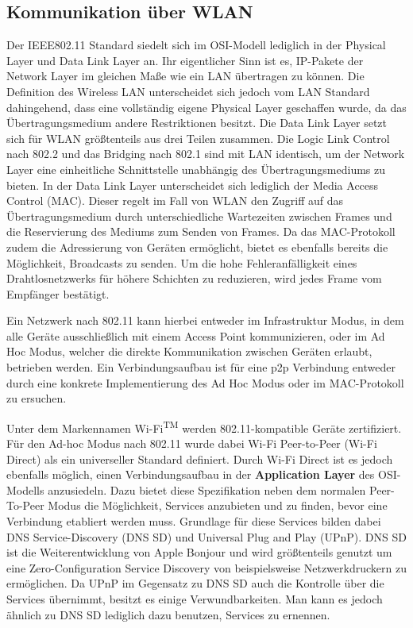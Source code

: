     \subsection{Kommunikation über WLAN}
        Der IEEE802.11 Standard siedelt sich im OSI-Modell lediglich in der Physical Layer und Data Link Layer an. Ihr eigentlicher Sinn ist es,
        IP-Pakete der Network Layer im gleichen Maße wie ein LAN übertragen zu können.
        Die Definition des Wireless LAN unterscheidet sich jedoch vom LAN Standard dahingehend, dass eine vollständig eigene Physical Layer geschaffen wurde,
        da das Übertragungsmedium andere Restriktionen besitzt. Die Data Link Layer setzt sich für WLAN größtenteils aus drei Teilen zusammen.
        Die Logic Link Control nach 802.2 und das Bridging nach 802.1 sind mit LAN identisch, um der Network Layer eine einheitliche Schnittstelle unabhängig des Übertragungsmediums zu bieten.
        In der Data Link Layer unterscheidet sich lediglich der Media Access Control (MAC).\cite[S.311]{AI-Sauter}
        Dieser regelt im Fall von WLAN den Zugriff auf das Übertragungsmedium durch unterschiedliche Wartezeiten zwischen Frames und die Reservierung des Mediums zum Senden von Frames.
        Da das MAC-Protokoll zudem die Adressierung von Geräten ermöglicht, bietet es ebenfalls bereits die Möglichkeit, Broadcasts zu senden.
        Um die hohe Fehleranfälligkeit eines Drahtlosnetzwerks für höhere Schichten zu reduzieren, wird jedes Frame vom Empfänger bestätigt.\cite[S.325-327]{AI-Sauter}
        
        Ein Netzwerk nach 802.11 kann hierbei entweder im Infrastruktur Modus, in dem alle Geräte ausschließlich mit einem Access Point kommunizieren,
        oder im Ad Hoc Modus, welcher die direkte Kommunikation zwischen Geräten erlaubt, betrieben werden.\cite[S.82]{AI-Sikora}
        Ein Verbindungsaufbau ist für eine p2p Verbindung entweder durch eine konkrete Implementierung des Ad Hoc Modus oder
        im MAC-Protokoll zu ersuchen.

        Unter dem Markennamen Wi-Fi\textsuperscript{TM} werden 802.11-kompatible Geräte zertifiziert. \cite[S.80]{AI-Sikora}
        Für den Ad-hoc Modus nach 802.11 wurde dabei Wi-Fi Peer-to-Peer (Wi-Fi Direct)\textregistered\cite{AI-wifiDirect} als ein universeller Standard definiert.
        Durch Wi-Fi Direct ist es jedoch ebenfalls möglich, einen Verbindungsaufbau in der {\bf Application Layer} des OSI-Modells anzusiedeln.
        Dazu bietet diese Spezifikation neben dem normalen Peer-To-Peer Modus die Möglichkeit, Services anzubieten und zu finden, bevor eine Verbindung etabliert werden muss.
        Grundlage für diese Services bilden dabei DNS Service-Discovery (DNS SD) und Universal Plug and Play (UPnP).
        DNS SD ist die Weiterentwicklung von Apple Bonjour und wird größtenteils genutzt um eine Zero-Configuration Service Discovery von beispielsweise Netzwerkdruckern zu ermöglichen. Da UPnP im Gegensatz zu DNS SD auch die Kontrolle über die Services übernimmt, besitzt es einige Verwundbarkeiten. Man kann es jedoch ähnlich zu DNS SD lediglich dazu benutzen, Services zu ernennen.\cite{AI-Esnaashari}
    
